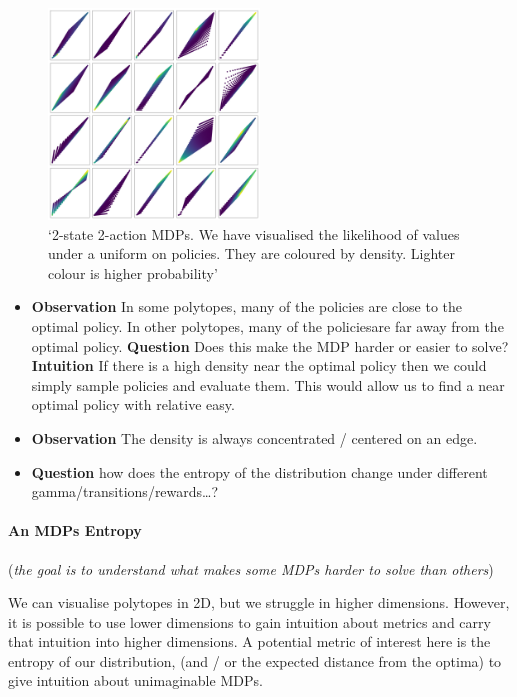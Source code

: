 \begin{figure}
\centering
\includegraphics[width=0.5\textwidth,height=0.5\textheight]{../../pictures/figures/polytope_densities.png}
\caption{`2-state 2-action MDPs. We have visualised the likelihood of
values under a uniform on policies. They are coloured by density.
Lighter colour is higher probability'}
\end{figure}

\begin{itemize}
\item
  \textbf{Observation} In some polytopes, many of the policies are close
  to the optimal policy. In other polytopes, many of the policiesare far
  away from the optimal policy. \textbf{Question} Does this make the MDP
  harder or easier to solve? \textbf{Intuition} If there is a high
  density near the optimal policy then we could simply sample policies
  and evaluate them. This would allow us to find a near optimal policy
  with relative easy.
\item
  \textbf{Observation} The density is always concentrated / centered on
  an edge.
\item
  \textbf{Question} how does the entropy of the distribution change
  under different gamma/transitions/rewards\ldots{}?
\end{itemize}

\paragraph{An MDPs Entropy}

(\emph{the goal is to understand what makes some MDPs harder to solve
than others})

We can visualise polytopes in 2D, but we struggle in higher dimensions.
However, it is possible to use lower dimensions to gain intuition about
metrics and carry that intuition into higher dimensions. A potential
metric of interest here is the entropy of our distribution, (and / or
the expected distance from the optima) to give intuition about
unimaginable MDPs.

